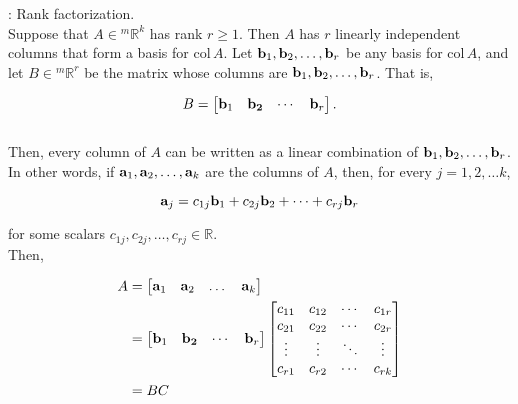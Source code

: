 \documentclass[10pt]{article}
\newcommand{\noin}{\noindent}
\begin{document}
\vspace{0.2in}
{\large 
{} 

\vspace{0.2in}


}

\vfill


\pagebreak


\noin {\bf Preamble}: Rank factorization. \\

\noin Suppose that $A\in {^m}\mathbb R^k$ has rank $r\ge 1$.  Then $A$ has $r$ linearly independent columns that form a basis for $\mathrm{col}\, A$.  Let ${\bf b}_1, {\bf b}_2, \dots, {\bf b}_r$ be any basis for $\mathrm{col}\, A$, and let $B\in {^m}\mathbb R^r$ be the matrix whose columns are ${\bf b}_1, {\bf b}_2, \dots, {\bf b}_r$.  That is,

$$B=\begin{bmatrix} {\bf b}_1 & {\bf b_2} &\cdots& {\bf b}_r \end{bmatrix}.$$\\

\noin Then, every column of $A$ can be written as a linear combination of ${\bf b}_1, {\bf b}_2, \dots, {\bf b}_r$.  In other words, if ${\bf a}_1, {\bf a}_2, \dots, {\bf a}_k$ are the columns of $A$, then, for every $j=1, 2, \dots k$,

$${\bf a}_j = c_{1j}{\bf b}_1+c_{2j}{\bf b}_2+\cdots+c_{rj}{\bf b}_r$$

\noin for some scalars $c_{1j}, c_{2j}, \dots, c_{rj}\in \mathbb R$.\\

\noin Then,

\begin{align*}
A &= \begin{bmatrix} {\bf a}_1 & {\bf a}_2 & \dots& {\bf a}_k \end{bmatrix} \\
&=\begin{bmatrix} {\bf b}_1 & {\bf b_2} &\cdots& {\bf b}_r \end{bmatrix} \begin{bmatrix} c_{11} & c_{12} & \cdots &c_{1r} \\ c_{21} & c_{22} & \cdots &c_{2r} \\ \vdots & \vdots & \ddots & \vdots \\ c_{r1} & c_{r2} & \cdots &c_{rk}\end{bmatrix} \\
&=BC
\end{align*}
\end{document}

